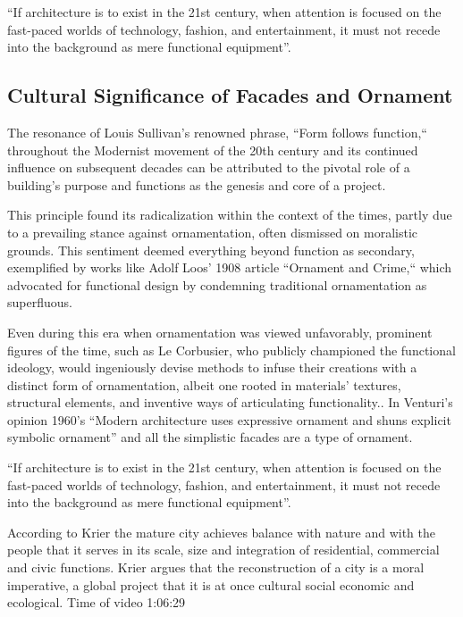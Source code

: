         ``If architecture is to exist in the 21st century, when attention is focused on the fast-paced worlds of technology, fashion, and entertainment, it must not recede into the background as mere functional equipment''\cite{Gage2015}.

%
\subsection{Cultural Significance of Facades and Ornament}
\label{subsec: FacadeandOrnament }
The resonance of Louis Sullivan's renowned phrase, ``Form follows function,`` throughout the Modernist movement of the 20th century and its continued influence on subsequent decades can be attributed to the pivotal role of a building's purpose and functions as the genesis and core of a project\cite{Hnin2022}.

This principle found its radicalization within the context of the times, partly due to a prevailing stance against ornamentation, often dismissed on moralistic grounds.
This sentiment deemed everything beyond function as secondary, exemplified by works like Adolf Loos' 1908 article ``Ornament and Crime,`` which advocated for functional design by condemning traditional ornamentation as superfluous\cite{Saglam2014}.

Even during this era when ornamentation was viewed unfavorably, prominent figures of the time, such as Le Corbusier, who publicly championed the functional ideology, would ingeniously devise methods to infuse their creations with a distinct form of ornamentation, albeit one rooted in materials' textures, structural elements, and inventive ways of articulating functionality.\cite{Saglam2014}.
In Venturi's opinion\cite{Venturi1972} 1960's ``Modern architecture uses expressive ornament and shuns explicit symbolic  ornament'' and all the simplistic facades are a type of ornament\cite{Saglam2014}.

          ``If architecture is to exist in the 21st century, when attention is focused on the fast-paced worlds of technology, fashion, and entertainment, it must not recede into the background as mere functional equipment''\cite{Gage2015}.

          According to Krier the mature city achieves balance with nature and with the people that it serves in its scale, size and integration of residential, commercial and civic functions.
          Krier argues that the reconstruction of a city is a moral imperative, a global project that it is at once cultural social economic and ecological. Time of video 1:06:29

